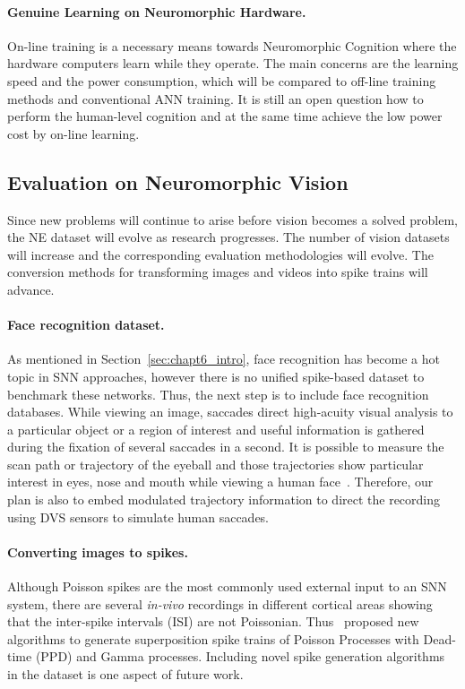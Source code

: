 \paragraph{Genuine Learning on Neuromorphic Hardware.}
On-line training is a necessary means towards Neuromorphic Cognition where the hardware computers learn while they operate.
The main concerns are the learning speed and the power consumption, which will be compared to off-line training methods and conventional ANN training.
It is still an open question how to perform the human-level cognition and at the same time achieve the low power cost by on-line learning.



\subsection{Evaluation on Neuromorphic Vision}
Since new problems will continue to arise before vision becomes a solved problem, the NE dataset will evolve as research progresses. 
The number of vision datasets will increase and the corresponding evaluation methodologies will evolve.
The conversion methods for transforming images and videos into spike trains will advance.

\paragraph{Face recognition dataset.}
As mentioned in Section~\ref{sec:chapt6_intro}, face recognition has become a hot topic in SNN approaches, however there is no unified spike-based dataset to benchmark these networks.
Thus, the next step is to include face recognition databases.
While viewing an image, saccades direct high-acuity visual analysis to a particular object or a region of interest and useful information is gathered during the fixation of several saccades in a second.
It is possible to measure the scan path or trajectory of the eyeball and those trajectories show particular interest in eyes, nose and mouth while viewing a human face~\citep{yarbus1967eye}.
Therefore, our plan is also to embed modulated trajectory information to direct the recording using DVS sensors to simulate human saccades.

\paragraph{Converting images to spikes.}
Although Poisson spikes are the most commonly used external input to an SNN system, there are several \textit{in-vivo} recordings in different cortical areas showing that the inter-spike intervals (ISI) are not Poissonian. 
Thus~\citet{deger2012statistical} proposed new algorithms to generate superposition spike trains of Poisson Processes with Dead-time (PPD) and Gamma processes.
Including novel spike generation algorithms in the dataset is one aspect of future work.

